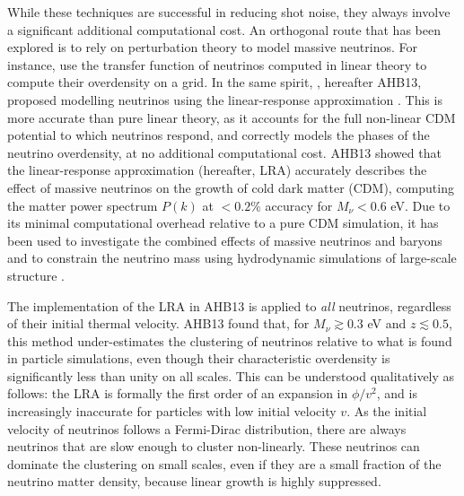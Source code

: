 \documentclass[useAMS, usenatbib]{mnras}
\newcommand{\spb}[1]{{\textcolor{green}{[{\bf SPB}: #1]}}}
\begin{document}
While these techniques are successful in reducing shot noise, they always involve a significant additional computational cost. An orthogonal route that has been explored is to rely on perturbation theory to model massive neutrinos. For instance, \cite{Brandbyge_2009} use the transfer function of neutrinos computed in linear theory to compute their overdensity on a grid. In the same spirit, \cite{AHB}, hereafter AHB13, proposed modelling neutrinos using the linear-response approximation \citep{Bond_1980, Ma_1994}. This is more accurate than pure linear theory, as it accounts for the full non-linear CDM potential to which neutrinos respond, and correctly models the phases of the neutrino overdensity, at no additional computational cost.
AHB13 showed that the linear-response approximation (hereafter, LRA) accurately describes the effect of massive neutrinos on the growth of cold dark matter (CDM), computing the matter power spectrum $P(k)$ at $ < 0.2\%$ accuracy for $M_\nu < 0.6$ eV. Due to its minimal computational overhead relative to a pure CDM simulation, it has been used to investigate the combined effects of massive neutrinos and baryons \citep{Mummery_2017} and to constrain the neutrino mass using hydrodynamic simulations of large-scale structure \citep{McCarthy_2018, McCarthy_2017}.

The implementation of the LRA in AHB13 is applied to \emph{all} neutrinos, regardless of their initial thermal velocity. AHB13 found that, for $M_\nu \gtrsim 0.3$ eV and $z \lesssim 0.5$, this method under-estimates the clustering of neutrinos relative to what is found in particle simulations, even though their characteristic overdensity is significantly less than unity on all scales. This can be understood qualitatively as follows: the LRA is formally the first order of an expansion in $\phi/v^2$, and is increasingly inaccurate for particles with low initial velocity $v$. As the initial velocity of neutrinos follows a Fermi-Dirac distribution, there are always neutrinos that are slow enough to cluster non-linearly. These neutrinos can dominate the clustering on small scales, even if they are a small fraction of the neutrino matter density, because linear growth is highly suppressed. %
\end{document}
